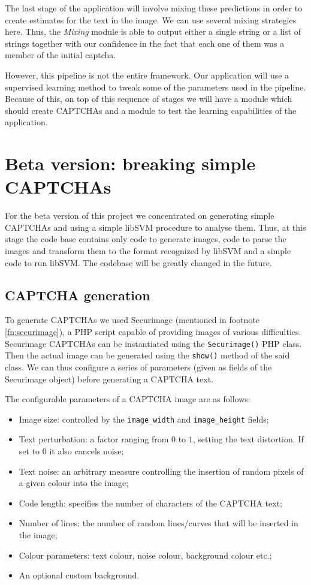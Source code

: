 \documentclass[a4paper,12pt]{article}
\begin{document}
The last stage of the application will involve mixing these predictions in
order to create estimates for the text in the image. We can use several mixing
strategies here. Thus, the \textit{Mixing} module is able to output either a
single string or a list of strings together with our confidence in the fact
that each one of them was a member of the initial captcha.

However, this pipeline is not the entire framework. Our application will use a
supervised learning method to tweak some of the parameters used in the
pipeline. Because of this, on top of this sequence of stages we will have a
module which should create CAPTCHAs and a module to test the learning
capabilities of the application.

\section*{Beta version: breaking simple CAPTCHAs}

For the beta version of this project we concentrated on generating simple
CAPTCHAs and using a simple libSVM procedure to analyse them. Thus, at this
stage the code base contains only code to generate images, code to parse the
images and transform them to the format recognized by libSVM and a simple code
to run libSVM. The codebase will be greatly changed in the future.

\subsection*{CAPTCHA generation}

To generate CAPTCHAs we used Securimage (mentioned in footnote
\ref{fn:securimage}), a PHP script capable of providing images of
various difficulties. Securimage CAPTCHAs can be instantiated using
the \texttt{Securimage()} PHP class. Then the actual image can be
generated using the \texttt{show()} method of the said class. We can
thus configure a series of parameters (given as fields of the Securimage
object) before generating a CAPTCHA text.

The configurable parameters of a CAPTCHA image are as follows:

\begin{itemize}
	\item Image size: controlled by the \texttt{image\_width} and
	\texttt{image\_height} fields;
	\item Text perturbation: a factor ranging from $0$ to $1$, setting the
	text distortion. If set to $0$ it also cancels noise;
	\item Text noise: an arbitrary measure controlling the insertion of
	random pixels of a given colour into the image;
	\item Code length: specifies the number of characters of the CAPTCHA
	text;
	\item Number of lines: the number of random lines/curves that will be
	inserted in the image;
	\item Colour parameters: text colour, noise colour, background colour etc.;
	\item An optional custom background.
\end{itemize}
\end{document}

